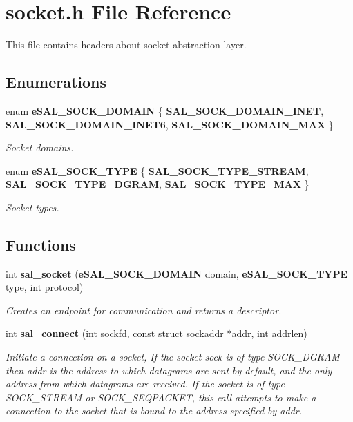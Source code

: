 \section{socket.h File Reference}
\label{socket_8h}


This file contains headers about socket abstraction layer.  


\subsection*{Enumerations}
\begin{DoxyCompactItemize}
\item 
enum {\bf eSAL\_\-SOCK\_\-DOMAIN} \{ {\bfseries SAL\_\-SOCK\_\-DOMAIN\_\-INET}, 
{\bfseries SAL\_\-SOCK\_\-DOMAIN\_\-INET6}, 
{\bfseries SAL\_\-SOCK\_\-DOMAIN\_\-MAX}
 \}
\begin{DoxyCompactList}\small\item\em Socket domains. \end{DoxyCompactList}\item 
enum {\bf eSAL\_\-SOCK\_\-TYPE} \{ {\bfseries SAL\_\-SOCK\_\-TYPE\_\-STREAM}, 
{\bfseries SAL\_\-SOCK\_\-TYPE\_\-DGRAM}, 
{\bfseries SAL\_\-SOCK\_\-TYPE\_\-MAX}
 \}
\begin{DoxyCompactList}\small\item\em Socket types. \end{DoxyCompactList}\end{DoxyCompactItemize}
\subsection*{Functions}
\begin{DoxyCompactItemize}
\item 
int {\bf sal\_\-socket} ({\bf eSAL\_\-SOCK\_\-DOMAIN} domain, {\bf eSAL\_\-SOCK\_\-TYPE} type, int protocol)
\begin{DoxyCompactList}\small\item\em Creates an endpoint for communication and returns a descriptor. \end{DoxyCompactList}\item 
int {\bf sal\_\-connect} (int sockfd, const struct sockaddr $\ast$addr, int addrlen)
\begin{DoxyCompactList}\small\item\em Initiate a connection on a socket, If the socket sock is of type SOCK\_\-DGRAM then addr is the address to which datagrams are sent by default, and the only address from which datagrams are received. If the socket is of type SOCK\_\-STREAM or SOCK\_\-SEQPACKET, this call attempts to make a connection to the socket that is bound to the address specified by addr. \end{DoxyCompactList}\end{DoxyCompactItemize}


